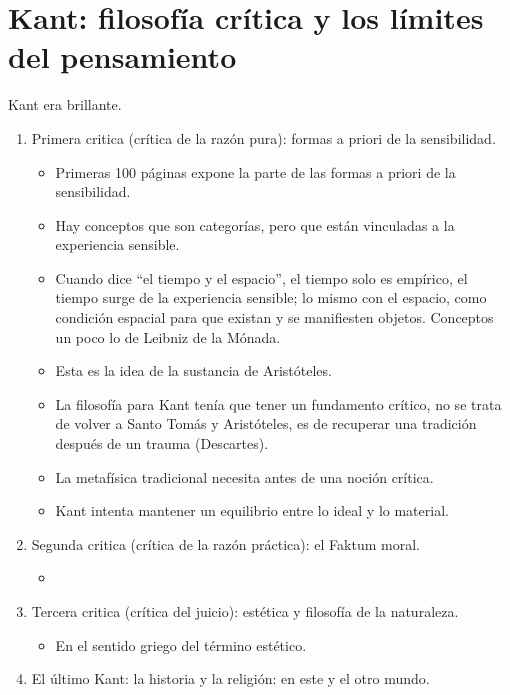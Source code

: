 \section{Kant: filosofía crítica y los límites del pensamiento}
Kant era brillante. 
\begin{enumerate}
    \item Primera critica (crítica de la razón pura): formas a priori de la sensibilidad. 
        \begin{itemize}
            \item Primeras 100 páginas expone la parte de las formas a priori de la sensibilidad.
            \item Hay conceptos que son categorías, pero que están vinculadas a la experiencia sensible. 
            \item Cuando dice ``el tiempo y el espacio'', el tiempo solo es empírico, el tiempo surge de la experiencia sensible; lo mismo con el espacio, como condición espacial para que existan y se manifiesten objetos. Conceptos un poco lo de Leibniz de la Mónada.
            \item Esta es la idea de la sustancia de Aristóteles. 
            \item La filosofía para Kant tenía que tener un fundamento crítico, no se trata de volver a Santo Tomás y Aristóteles, es de recuperar una tradición después de un trauma (Descartes). 
            \item La metafísica tradicional necesita antes de una noción crítica. 
            \item Kant intenta mantener un equilibrio entre lo ideal y lo material.
        \end{itemize}
    \item Segunda critica (crítica de la razón práctica): el Faktum moral.
        \begin{itemize}
            \item 
        \end{itemize}
    \item Tercera critica (crítica del juicio): estética y filosofía de la naturaleza. 
        \begin{itemize}
            \item En el sentido griego del término estético.
        \end{itemize}
    \item El último Kant: la historia y la religión:  en este y el otro mundo. 
\end{enumerate}

